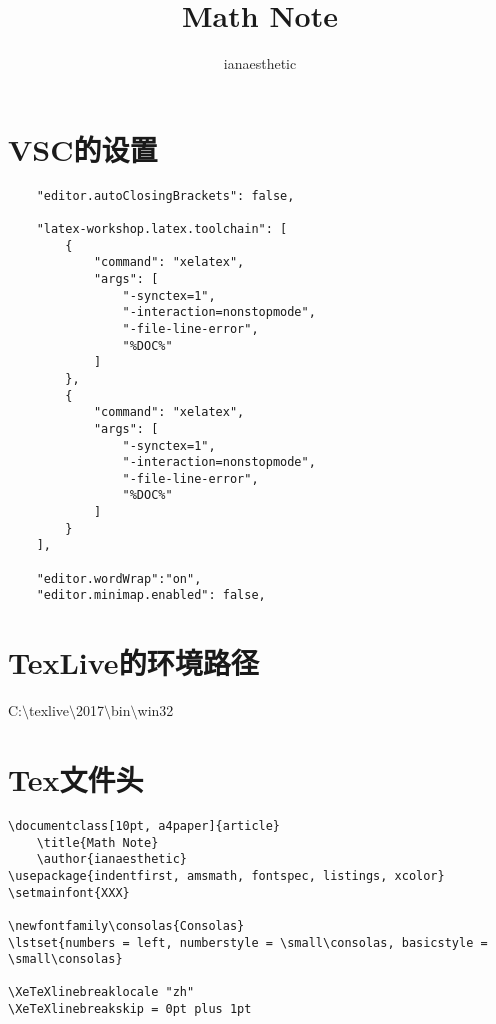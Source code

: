 \documentclass[10pt, a4paper]{article}
\title{Math Note}
\author{ianaesthetic}
\begin{document}
    \section{VSC的设置}
        \begin{lstlisting}
    "editor.autoClosingBrackets": false,
            
    "latex-workshop.latex.toolchain": [
        {
            "command": "xelatex",
            "args": [
                "-synctex=1",
                "-interaction=nonstopmode",
                "-file-line-error",
                "%DOC%"
            ]
        },
        {
            "command": "xelatex",
            "args": [
                "-synctex=1",
                "-interaction=nonstopmode",
                "-file-line-error",
                "%DOC%"
            ]
        }
    ],
            
    "editor.wordWrap":"on",
    "editor.minimap.enabled": false,
        \end{lstlisting}

    \section{TexLive的环境路径}
        C:$\setminus$texlive$\setminus$2017$\setminus$bin$\setminus$win32
    \section{Tex文件头}
\begin{lstlisting}
\documentclass[10pt, a4paper]{article}
    \title{Math Note}
    \author{ianaesthetic}
\usepackage{indentfirst, amsmath, fontspec, listings, xcolor}
\setmainfont{XXX}
    
\newfontfamily\consolas{Consolas}
\lstset{numbers = left, numberstyle = \small\consolas, basicstyle = \small\consolas}
    
\XeTeXlinebreaklocale "zh"
\XeTeXlinebreakskip = 0pt plus 1pt
\end{lstlisting}
\end{document}
